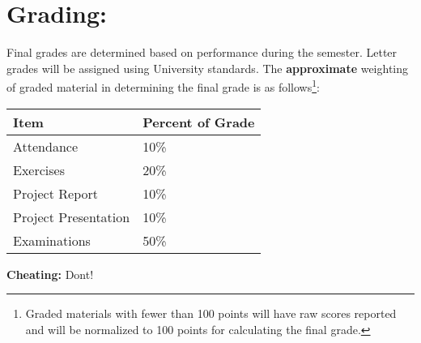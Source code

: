 \documentclass[12pt]{article}
\begin{document}
\section*{Grading:} Final grades are determined based on performance during the semester.  Letter grades will be assigned using University standards.  The \textbf{approximate} weighting of graded material in determining the final grade is as follows\footnote{Graded materials with fewer than 100 points will have raw scores reported and will be normalized to 100 points for calculating the final grade.}:
\begin{table}[h!]
   \centering
   \begin{tabular}{l l}
Item & Percent of Grade \\
\hline
\hline
Attendance & 10\% \\
Exercises & 20\% \\
Project Report & 10\% \\
Project Presentation & 10\% \\
Examinations & 50\% \\
\hline
\end{tabular}
\end{table}

\textbf{Cheating:} Dont!

\clearpage
\end{document}
